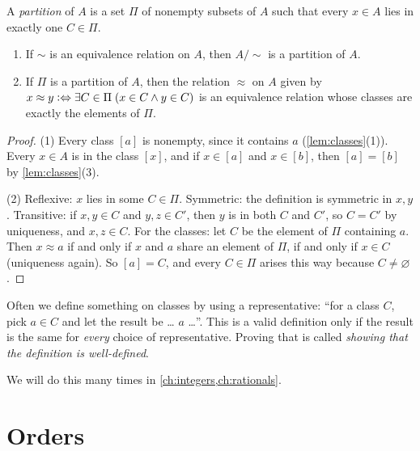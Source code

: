 \begin{definition}[Partition]
\label{def:partition}
A \emph{partition} of $A$ is a set $\Pi$ of nonempty subsets of $A$ such that
every $x \in A$ lies in exactly one $C \in \Pi$.
\end{definition}

\begin{theorem}
\label{thm:partition}
\leavevmode
\begin{enumerate}
  \item If $\sim$ is an equivalence relation on $A$, then $A/{\sim}$ is a
    partition of $A$.
  \item If $\Pi$ is a partition of $A$, then the relation $\approx$ on $A$ given
    by $x \approx y \mathrel{\vcentcolon\Leftrightarrow} \exists C \in \Pi\; (x \in C \land y \in C)$ is an
    equivalence relation whose classes are exactly the elements of $\Pi$.
\end{enumerate}
\end{theorem}

\begin{proof}
(1) Every class $[a]$ is nonempty, since it contains $a$
(\cref{lem:classes}(1)). Every $x \in A$ is in the class $[x]$, and if $x \in [a]$
and $x \in [b]$, then $[a] = [b]$ by \cref{lem:classes}(3).

(2) Reflexive: $x$ lies in some $C \in \Pi$. Symmetric: the definition is
symmetric in $x, y$. Transitive: if $x, y \in C$ and $y, z \in C'$, then $y$ is in
both $C$ and $C'$, so $C = C'$ by uniqueness, and $x, z \in C$. For the classes:
let $C$ be the element of $\Pi$ containing $a$. Then $x \approx a$ if and only if
$x$ and $a$ share an element of $\Pi$, if and only if $x \in C$ (uniqueness
again). So $[a] = C$, and every $C \in \Pi$ arises this way because $C \neq
\varnothing$.
\end{proof}

\begin{definition}
\label{def:well-defined}
Often we define something on classes by using a representative: \enquote{for a
class $C$, pick $a \in C$ and let the result be \dots{} $a$ \dots}. This is a
valid definition only if the result is the same for \emph{every} choice of
representative. Proving that is called \emph{showing that the definition is
well-defined}.
\end{definition}

We will do this many times in \cref{ch:integers,ch:rationals}.

\section{Orders}

